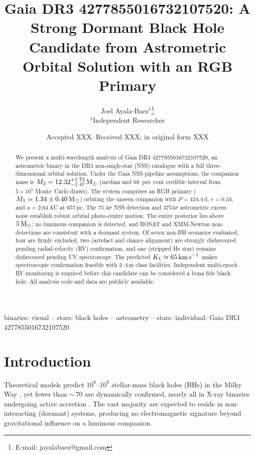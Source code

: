 \documentclass[usenatbib,fleqn]{mnras}
\title[Gaia DR3 4277855016732107520: A Strong Dormant BH Candidate]
{Gaia DR3 4277855016732107520: A Strong Dormant Black Hole\\
 Candidate from Astrometric Orbital Solution with an RGB Primary}
\author[J. Ayala-Baez]{
  Joel Ayala-Baez$^{1}$\thanks{E-mail: jayalabaez@gmail.com}\\
  $^{1}$Independent Researcher
}
\date{Accepted XXX. Received XXX; in original form XXX}
\newcommand{\Msun}{{\rm M}_\odot}
\newcommand{\kms}{{\rm km\,s}^{-1}}
\begin{document}
\label{firstpage}
\pagerange{\pageref{firstpage}--\pageref{LastPage}}
\maketitle

\begin{abstract}
We present a multi-wavelength analysis of Gaia DR3
4277855016732107520, an astrometric binary in the DR3 non-single-star
(NSS) catalogue with a full three-dimensional orbital solution.
Under the Gaia NSS pipeline assumptions, the companion mass is
$M_2 = 12.32^{+1.73}_{-1.47}\,\Msun$ (median and 68~per~cent
credible interval from $5 \times 10^5$ Monte~Carlo draws).  The
system comprises an RGB primary
($M_1 = 1.34 \pm 0.40\,\Msun$) orbiting the unseen companion with
$P = 424.4$\,d, $e = 0.34$, and $a = 2.64$\,AU at 657\,pc.  The
$75.4\sigma$ NSS detection and $3753\sigma$ astrometric excess noise
establish robust orbital photo-centre motion.  The entire posterior
lies above $5\,\Msun$; no luminous companion is detected, and ROSAT
and XMM-Newton non-detections are consistent with a dormant system.
Of seven non-BH scenarios evaluated, four are firmly excluded, two
(artefact and chance alignment) are strongly disfavoured pending
radial-velocity (RV) confirmation, and one (stripped He star) remains
disfavoured pending UV spectroscopy.  The predicted
$K_1 \approx 65\,\kms$ makes spectroscopic confirmation feasible
with 2--4\,m class facilities.  Independent multi-epoch RV monitoring
is required before this candidate can be considered a bona fide
black hole.  All analysis code and data are publicly available.
\end{abstract}

\begin{keywords}
binaries: visual -- stars: black holes -- astrometry --
stars: individual: Gaia DR3 4277855016732107520
\end{keywords}

\section{Introduction}
\label{sec:intro}

Theoretical models predict $10^8$--$10^9$ stellar-mass black holes
(BHs) in the Milky Way \citep{AgolKamionkowski2002, Shapiro1983},
yet fewer than $\sim$\,70 are dynamically confirmed, nearly all in
X-ray binaries undergoing active accretion
\citep{RemillardMcClintock2006}.  The vast majority are expected to
reside in non-interacting (dormant) systems, producing no
electromagnetic signature beyond gravitational influence on a
luminous companion.
\end{document}

